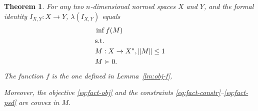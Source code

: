 \documentclass[12pt]{article}
\newtheorem{theorem}{Theorem}
\begin{document}
\begin{theorem}\label{thm:fact-convex}
  For any two $n$-dimensional normed spaces $X$ and $Y$, and the
  formal identity $I_{X,Y}:X \to Y$, $\lambda(I_{X,Y})$ equals
  \begin{align}
    &\inf %
    f(M)  \label{eq:fact-obj}\\
    &\text{s.t.}\notag\\
    &M: X \to X^*,\|M\| \le 1\label{eq:fact-constr}\\
    &M \succ 0.\label{eq:fact-psd}
  \end{align}
  The function $f$ is the one defined in Lemma~\ref{lm:obj-f}.

  Moreover, the objective \eqref{eq:fact-obj} and the constraints
  \eqref{eq:fact-constr}--\eqref{eq:fact-psd} are convex in $M$.
\end{theorem}
\end{document}
